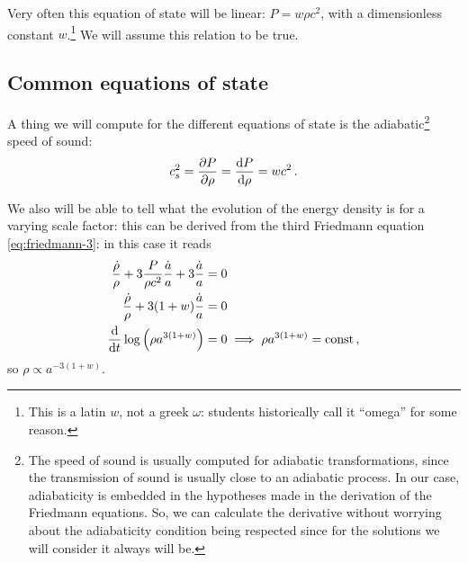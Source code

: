 \documentclass[main.tex]{subfiles}
\begin{document}
Very often this equation of state will be linear: \(P = w \rho c^2\), with a dimensionless constant \(w\).\footnote{This is a latin \(w\), not a greek \(\omega \): students historically call it ``omega'' for some reason.}
We will assume this relation to be true.



\subsection{Common equations of state}
\label{sec:common-equations-of-state}

A thing we will compute for the different equations of state is the adiabatic\footnote{The speed of sound is usually computed for adiabatic transformations, since the transmission of sound is usually close to an adiabatic process. In our case, adiabaticity is embedded in the hypotheses made in the derivation of the Friedmann equations. So, we can calculate the derivative without worrying about the adiabaticity condition being respected since for the solutions we will consider it always will be.} speed of sound: 
%
\begin{align}
c^2_{s} = \pdv{P}{\rho } = \dv{P}{\rho } = w c^2
\,.
\end{align}

We also will be able to tell what the evolution of the energy density is for a varying scale factor:
this can be derived from the third Friedmann equation \eqref{eq:friedmann-3}: in this case it reads 
%
\begin{align}
\frac{\dot{\rho}}{\rho } + 3\frac{P}{\rho c^2} \frac{\dot{a}}{a} + 3 \frac{\dot{a}}{a}  &= 0   \\
\frac{\dot{\rho}}{\rho } + 3 (1+w) \frac{\dot{a}}{a} &= 0 \\
\dv{}{t} \log \qty(\rho a^{3(1+w)}) &=0 \implies \rho a^{3(1+w)} = \text{const}
\,,
\end{align}
%
so \(\rho \propto a^{-3(1+w)}\). 
\end{document}
